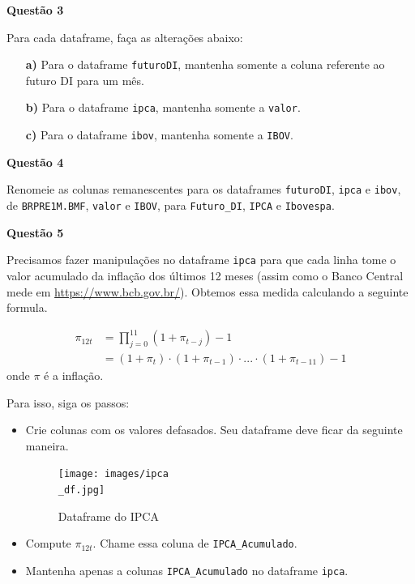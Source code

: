 \documentclass[12pt, a4paper]{article}
\begin{document}
\textbf{Questão 3}

Para cada dataframe, faça as alterações abaixo:

\begin{itemize}
	\item[\textbf{a)}] Para o dataframe \texttt{futuroDI}, mantenha somente a coluna referente ao futuro DI para um mês.
	
	
	
	\item[\textbf{b)}] Para o dataframe \texttt{ipca}, mantenha somente a \texttt{valor}.
	
	
	
	\item[\textbf{c)}] Para o dataframe \texttt{ibov}, mantenha somente a \texttt{IBOV}.
\end{itemize}



\textbf{Questão 4}

Renomeie as colunas remanescentes para os dataframes \texttt{futuroDI}, \texttt{ipca} e \texttt{ibov}, de \texttt{BRPRE1M.BMF}, \texttt{valor} e \texttt{IBOV}, para \texttt{Futuro\_DI}, \texttt{IPCA} e \texttt{Ibovespa}.
 
 
 
 
\textbf{Questão 5}

Precisamos fazer manipulações no dataframe \texttt{ipca} para que cada linha tome o valor acumulado da inflação dos últimos 12 meses (assim como o Banco Central mede em \url{https://www.bcb.gov.br/}). Obtemos essa medida calculando a seguinte formula.

\begin{align*}
	\pi_{12t} &= \prod_{j=0}^{11} (1+\pi_{t-j}) - 1\\
	&= (1+\pi_t)\cdot (1+\pi_{t-1})\cdot ... \cdot (1+\pi_{t-11}) - 1
\end{align*}
onde $\pi$ é a inflação.

Para isso, siga os passos:

\begin{itemize}
	\item Crie colunas com os valores defasados. Seu dataframe deve ficar da seguinte maneira.
	
	\begin{figure}[H]
		\caption{Dataframe do IPCA}
		\centering
		\texttt{[image: images/ipca\\\_df.jpg]}
	\end{figure}


	\item Compute $\pi_{12t}$. Chame essa coluna de \texttt{IPCA\_Acumulado}.
	
	
	\item Mantenha apenas a colunas \texttt{IPCA\_Acumulado} no dataframe \texttt{ipca}.
\end{itemize}
 
\end{document}
